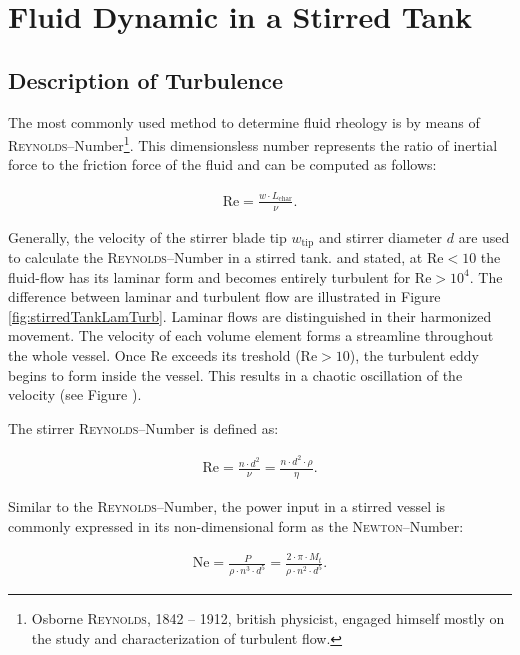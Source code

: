 \section{Fluid Dynamic in a Stirred Tank}

\subsection{Description of Turbulence}
The most commonly used method to determine fluid rheology is by means of \textsc{Reynolds}--Number\footnote{Osborne \textsc{Reynolds}, 1842 -- 1912, british physicist, engaged himself mostly on the study and characterization of turbulent flow.}. This dimensionsless number represents the ratio of inertial force to the friction force of the fluid and can be computed as follows:

\begin{align} \label{eq:reynoldGeneral}
    \text{Re} = \frac{w \cdot L_{\text{char}}}{\nu}.
\end{align}

Generally, the velocity of the stirrer blade tip $w_{\text{tip}}$ and stirrer diameter $d$ are used to calculate the \textsc{Reynolds}--Number in a stirred tank. \citet{Kraume2012Transport} and \citet{Wollny2010Diss} stated, at $\text{Re} < 10$ the fluid-flow has its laminar form and becomes entirely turbulent for $\text{Re} > 10^4$. The difference between laminar and turbulent flow are illustrated in Figure \ref{fig:stirredTankLamTurb}. Laminar flows are distinguished in their harmonized movement. The velocity of each volume element forms a streamline throughout the whole vessel. Once Re exceeds its treshold ($\text{Re} > 10$), the turbulent eddy begins to form inside the vessel. This results in a chaotic oscillation of the velocity (see Figure ).

The stirrer \textsc{Reynolds}--Number is defined as:

\begin{gather}
    \text{Re} = \frac{n \cdot d^2}{\nu} = \frac{n \cdot d^2 \cdot \rho}{\eta}.
\end{gather}

Similar to the \textsc{Reynolds}--Number, the power input in a stirred vessel is commonly expressed in its non-dimensional form as the \textsc{Newton}--Number:

\begin{gather}
    \text{Ne} = \frac{P}{\rho \cdot n^3 \cdot d^5} = \frac{2 \cdot \pi \cdot M_t}{\rho \cdot n^2 \cdot d^5}.
\end{gather}


